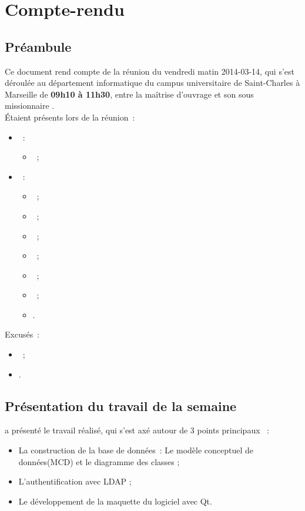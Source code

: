 \documentclass[11pt,fleqn]{report}
\begin{document}
\ZMakeCover


\chapter*{Compte-rendu}
\setcounter{chapter}{1}

\section{Préambule}
Ce document rend compte de la réunion du vendredi matin 2014-03-14, qui s'est déroulée au département informatique du campus universitaire de Saint-Charles à Marseille de \textbf{09h10 à 11h30}, entre la maîtrise d'ouvrage \mo et son sous missionnaire \amo.
\\
Étaient présents lors de la réunion~:
\begin{itemize}
	\item \mo~:
	\begin{itemize}
		\item \Agopian~;
	\end{itemize}
	\item \amo~:
	\begin{itemize}
		\item \Cadon~;
		\item \Julien~;
		\item \Lericolais~;
		\item \Mezelle~;
		\item \Pachy~;
		\item \SuangaWeto~;
		\item \Toure.
	\end{itemize}
\end{itemize}
Excusés~:
\begin{itemize}
	\item \Balde~;
	\item \Gairoard.
\end{itemize}

\section{Présentation du travail de la semaine}
\amo a présenté le travail réalisé, qui s'est axé autour de 3 points principaux ~:
\begin{itemize}
	\item  La construction de la base de données~: Le modèle conceptuel de données(MCD) et le diagramme des classes ;
	\item L'authentification avec LDAP ;
	\item Le développement  de la maquette du logiciel avec Qt.
\end{itemize} 
\end{document}
